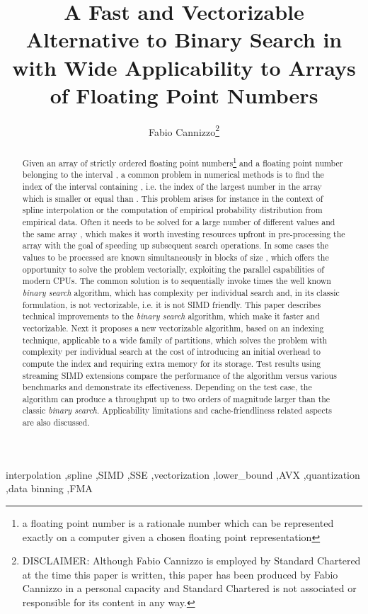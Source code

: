 \documentclass[preprint,1p,times]{elsarticle}
\begin{document}
\begin{frontmatter}
\title{A Fast and Vectorizable Alternative to Binary Search in  with Wide Applicability to Arrays of Floating Point Numbers}

\author{\renewcommand*{\thefootnote}{\fnsymbol{footnote}}
	Fabio Cannizzo\footnote{DISCLAIMER: Although Fabio Cannizzo is employed by Standard Chartered at the time this paper is written, this paper has been produced by Fabio Cannizzo in a personal capacity and Standard Chartered is not associated or responsible for its content in any way.}}

\begin{abstract}
Given an array  of  strictly ordered floating point numbers\footnote{a floating point number is a rationale number which can be represented exactly on a computer given a chosen floating point representation} and a floating point number  belonging to the interval , a common problem in numerical methods is to find the index  of the interval  containing , i.e. the index of the largest number in the array  which is smaller or equal than . This problem arises for instance in the context of spline interpolation or the computation of empirical probability distribution from empirical data. Often it needs to be solved for a large number of different values  and the same array , which makes it worth investing resources upfront in pre-processing the array  with the goal of speeding up subsequent search operations. In some cases the values  to be processed are known simultaneously in blocks of size , which offers the opportunity to solve the problem vectorially, exploiting the parallel capabilities of modern CPUs.
The common solution is to sequentially invoke  times the well known \textit{binary search} algorithm, which has complexity  per individual search and, in its classic formulation, is not vectorizable, i.e. it is not SIMD friendly. This paper describes technical improvements to the \textit{binary search} algorithm, which make it faster and vectorizable. Next it proposes a new vectorizable algorithm, based on an indexing technique,  applicable to a wide family of  partitions, which solves the problem with complexity  per individual search at the cost of introducing an initial overhead to compute the index and requiring extra memory for its storage. Test results using streaming SIMD extensions compare the performance of the algorithm versus various benchmarks and demonstrate its effectiveness. Depending on the test case, the algorithm can produce a throughput up to two orders of magnitude larger than the classic \textit{binary search}. Applicability limitations and cache-friendliness related aspects are also discussed.
\end{abstract}

\begin{keyword}
interpolation \sep spline \sep SIMD \sep SSE \sep vectorization \sep lower\_bound \sep AVX \sep quantization \sep data binning \sep FMA
\end{keyword}

\end{frontmatter}
\end{document}
